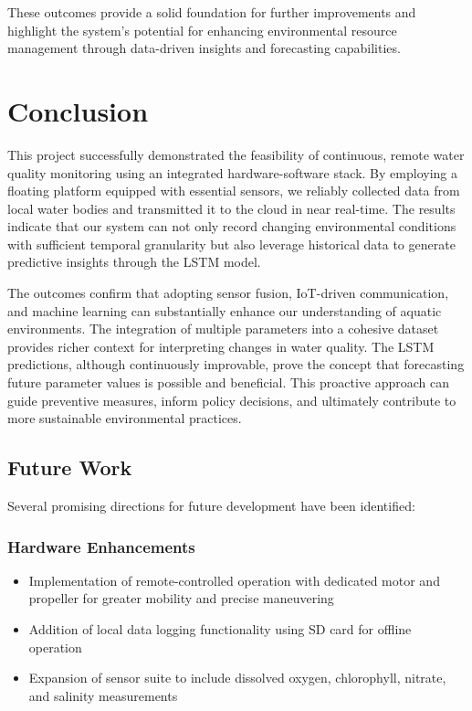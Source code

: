 \documentclass[conference]{IEEEtran}
\begin{document}
These outcomes provide a solid foundation for further improvements and highlight the system's potential for enhancing environmental resource management through data-driven insights and forecasting capabilities.

\section{Conclusion}
This project successfully demonstrated the feasibility of continuous, remote water quality monitoring using an integrated hardware-software stack. By employing a floating platform equipped with essential sensors, we reliably collected data from local water bodies and transmitted it to the cloud in near real-time. The results indicate that our system can not only record changing environmental conditions with sufficient temporal granularity but also leverage historical data to generate predictive insights through the LSTM model.

The outcomes confirm that adopting sensor fusion, IoT-driven communication, and machine learning can substantially enhance our understanding of aquatic environments. The integration of multiple parameters into a cohesive dataset provides richer context for interpreting changes in water quality. The LSTM predictions, although continuously improvable, prove the concept that forecasting future parameter values is possible and beneficial. This proactive approach can guide preventive measures, inform policy decisions, and ultimately contribute to more sustainable environmental practices.

\subsection{Future Work}
Several promising directions for future development have been identified:

\subsubsection{Hardware Enhancements}
\begin{itemize}
\item Implementation of remote-controlled operation with dedicated motor and propeller for greater mobility and precise maneuvering
\item Addition of local data logging functionality using SD card for offline operation
\item Expansion of sensor suite to include dissolved oxygen, chlorophyll, nitrate, and salinity measurements
\end{itemize}
\end{document}
